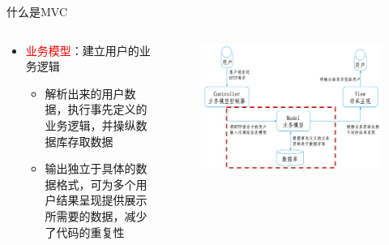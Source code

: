 \begin{frame}{什么是MVC}
\begin{columns}
\begin{column}{0.4\textwidth}
\begin{itemize}
    \item \textcolor{red}{业务模型}：建立用户的业务逻辑
    \begin{itemize}
        \item 解析出来的用户数据，执行事先定义的业务逻辑，并操纵数据库存取数据
        \item 输出独立于具体的数据格式，可为多个用户结果呈现提供展示所需要的数据，减少了代码的重复性
    \end{itemize}
\end{itemize}
\end{column}

\begin{column}{0.6\textwidth}
\begin{figure}
    \centering
    \includegraphics[width=\textwidth]{figure/fig-17.jpg}
\end{figure}
\end{column}

\end{columns}
\end{frame}


